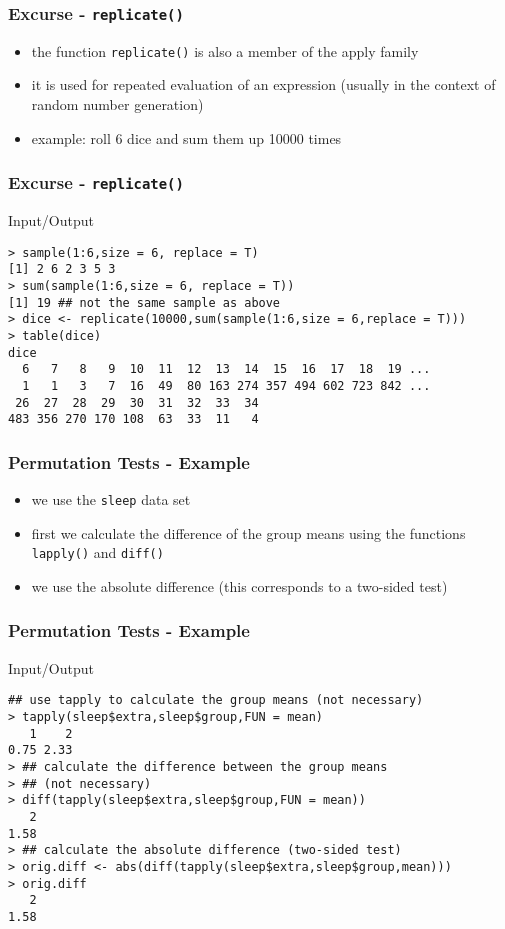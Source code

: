 \documentclass[xcolor={table},handout]{beamer}
\begin{document}
\begin{frame}[fragile]\frametitle{Excurse - \texttt{replicate()}}
\begin{itemize}
\item the function \texttt{replicate()} is also a member of the apply family
\item it is used for repeated evaluation of an expression (usually in the context of random number generation)
\item example: roll 6 dice and sum them up 10000 times
\end{itemize}
\end{frame}

\begin{frame}[fragile]\frametitle{Excurse - \texttt{replicate()}}
\begin{exampleblock}{Input/Output}\footnotesize
\begin{verbatim}
> sample(1:6,size = 6, replace = T)
[1] 2 6 2 3 5 3
> sum(sample(1:6,size = 6, replace = T))
[1] 19 ## not the same sample as above
> dice <- replicate(10000,sum(sample(1:6,size = 6,replace = T)))
> table(dice)
dice
  6   7   8   9  10  11  12  13  14  15  16  17  18  19 ... 
  1   1   3   7  16  49  80 163 274 357 494 602 723 842 ...
 26  27  28  29  30  31  32  33  34 
483 356 270 170 108  63  33  11   4 
\end{verbatim}
\end{exampleblock}
\end{frame}


\begin{frame}\frametitle{Permutation Tests - Example}
  \begin{itemize}
  \item we use the \texttt{sleep} data set
  \item first we calculate the difference of the group means using the functions \texttt{lapply()} and \texttt{diff()}
  \item we use the absolute difference (this corresponds to a two-sided test)
  \end{itemize}
\end{frame}


\begin{frame}[fragile]\frametitle{Permutation Tests - Example}
\begin{exampleblock}{Input/Output}\small
\begin{verbatim}
## use tapply to calculate the group means (not necessary)
> tapply(sleep$extra,sleep$group,FUN = mean)
   1    2 
0.75 2.33 
> ## calculate the difference between the group means
> ## (not necessary)
> diff(tapply(sleep$extra,sleep$group,FUN = mean))
   2 
1.58 
> ## calculate the absolute difference (two-sided test)
> orig.diff <- abs(diff(tapply(sleep$extra,sleep$group,mean)))
> orig.diff
   2 
1.58 
\end{verbatim}
\end{exampleblock}
\end{frame}
\end{document}
